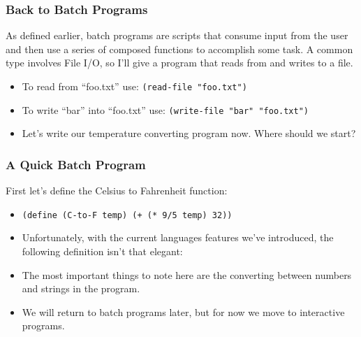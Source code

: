 \documentclass{beamer}
\begin{document}
\begin{frame}
  \frametitle{Back to Batch Programs}
  As defined earlier, batch programs are scripts that consume input from the
  user and then use a series of composed functions to accomplish some task.
  A common type involves File I/O, so I'll give a program that reads from and
  writes to a file.
  \begin{itemize}
  \item<2-> To read from ``foo.txt'' use: \texttt{(read-file "foo.txt")}
  \item<3-> To write ``bar'' into ``foo.txt'' use: \texttt{(write-file "bar" "foo.txt")}
  \item<4-> Let's write our temperature converting program now. Where should we start? 
  \end{itemize}  
\end{frame}


\begin{frame}
  \frametitle{A Quick Batch Program}
  First let's define the Celsius to Fahrenheit function:
  \begin{itemize}
  \item<2-> \texttt{(define (C-to-F temp) (+ (* 9/5 temp) 32))}
  \item<3-> Unfortunately, with the current languages features we've introduced,
    the following definition isn't that elegant: \convert
  \item<4-> The most important things to note here are the converting between
    numbers and strings in the program.
  \item<5-> We will return to batch programs later, but for now we move to interactive programs.
  \end{itemize}
\end{frame}
\end{document}
